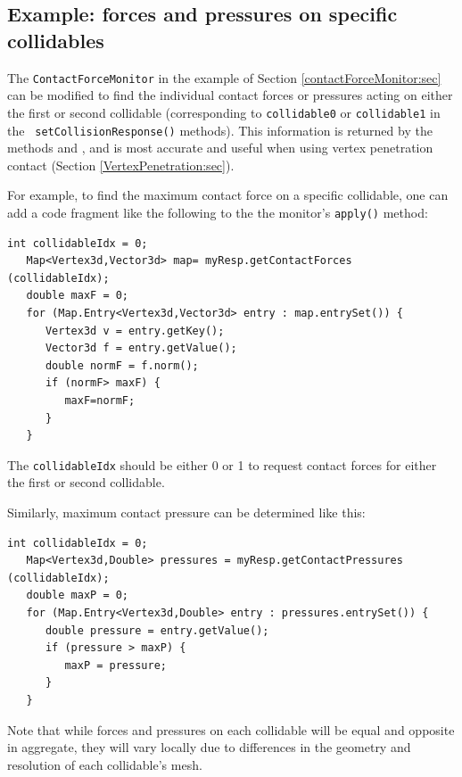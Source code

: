 \subsection{Example: forces and pressures on specific collidables}

The {\tt ContactForceMonitor} in the example of
Section \ref{contactForceMonitor:sec} can be modified to find the individual
contact forces or pressures acting on either the first or second collidable
(corresponding to {\tt collidable0} or {\tt collidable1} in the {\tt
setCollisionResponse()} methods). This information is 
returned by the methods
and
,
and is most accurate and useful when using vertex penetration contact
(Section \ref{VertexPenetration:sec}).

For example, to find the maximum contact force on a specific collidable, one
can add a code fragment like the following to the the monitor's {\tt apply()}
method:
%
\begin{lstlisting}[]
   int collidableIdx = 0;
   Map<Vertex3d,Vector3d> map= myResp.getContactForces (collidableIdx);
   double maxF = 0;
   for (Map.Entry<Vertex3d,Vector3d> entry : map.entrySet()) {
      Vertex3d v = entry.getKey();
      Vector3d f = entry.getValue();
      double normF = f.norm();
      if (normF> maxF) {
         maxF=normF;
      }
   }
\end{lstlisting}
The {\tt collidableIdx} should be either 0 or 1 to request contact forces for
either the first or second collidable.

Similarly, maximum contact pressure can be determined like this:
\begin{lstlisting}[]
   int collidableIdx = 0;
   Map<Vertex3d,Double> pressures = myResp.getContactPressures (collidableIdx);
   double maxP = 0;
   for (Map.Entry<Vertex3d,Double> entry : pressures.entrySet()) {
      double pressure = entry.getValue();
      if (pressure > maxP) {
         maxP = pressure;
      }
   }
\end{lstlisting}

\begin{sideblock}
Note that while forces and pressures on each collidable will be equal and
opposite in aggregate, they will vary locally due to differences in the
geometry and resolution of each collidable's mesh.
\end{sideblock}
         
